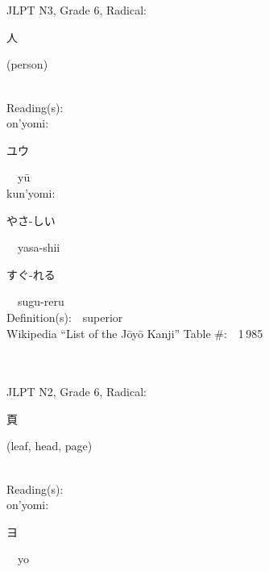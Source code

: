 \begin{multicols}{2}
\ \ \\
{\fontsize{34pt}{40pt}  }\ \ \\  %
{JLPT N3, Grade 6, Radical:\ \ {\begin{CJK}{UTF8}{min} 人 \end{CJK}} (person) } \\
Reading(s):\ \ \\
{\hspace*{1em}}on'yomi:\ \ \\
{\hspace*{2em}}{\begin{CJK}{UTF8}{min} ユウ \end{CJK}}\ \ y\=u\ \ \\
{\hspace*{1em}}kun'yomi:\ \ \\
{\hspace*{2em}}{\begin{CJK}{UTF8}{min} やさ-しい \end{CJK}}\ \ yasa-shii\ \ \\
{\hspace*{2em}}{\begin{CJK}{UTF8}{min} すぐ-れる \end{CJK}}\ \ sugu-reru\ \ \\
Definition(s):\ \ superior \\
Wikipedia ``List of the J\=oy\=o Kanji'' Table \#:\ \ 1\,985 \\
\ \ \\
{\fontsize{34pt}{40pt}  }\ \ \\  %
{JLPT N2, Grade 6, Radical:\ \ {\begin{CJK}{UTF8}{min} 頁 \end{CJK}} (leaf, head, page) } \\
Reading(s):\ \ \\
{\hspace*{1em}}on'yomi:\ \ \\
{\hspace*{2em}}{\begin{CJK}{UTF8}{min} ヨ \end{CJK}}\ \ yo\ \ \\

\end{multicols}
